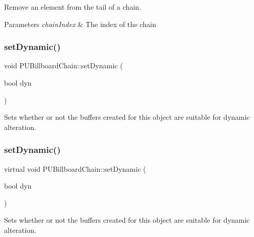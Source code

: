 Remove an element from the \textquotesingle{}tail\textquotesingle{} of a chain. 
\begin{DoxyParams}{Parameters}
{\em chain\+Index} & The index of the chain \\
\hline
\end{DoxyParams}
\mbox{\label{classPUBillboardChain_abe44e442622bb8cbb1400ec34efb43d5}} 
\subsubsection{\texorpdfstring{set\+Dynamic()}{setDynamic()}\hspace{0.1cm}{\footnotesize\ttfamily [1/2]}}
{\footnotesize\ttfamily void P\+U\+Billboard\+Chain\+::set\+Dynamic (\begin{DoxyParamCaption}\item[{bool}]{dyn }\end{DoxyParamCaption})\hspace{0.3cm}{\ttfamily [virtual]}}

Sets whether or not the buffers created for this object are suitable for dynamic alteration. \mbox{\label{classPUBillboardChain_a14bf6b30ff77c3497ff35e8b090397ba}} 
\subsubsection{\texorpdfstring{set\+Dynamic()}{setDynamic()}\hspace{0.1cm}{\footnotesize\ttfamily [2/2]}}
{\footnotesize\ttfamily virtual void P\+U\+Billboard\+Chain\+::set\+Dynamic (\begin{DoxyParamCaption}\item[{bool}]{dyn }\end{DoxyParamCaption})\hspace{0.3cm}{\ttfamily [virtual]}}

Sets whether or not the buffers created for this object are suitable for dynamic alteration. \mbox{\label{classPUBillboardChain_a3cf5eab8b485ab9cafd87fd58623a288}} 
